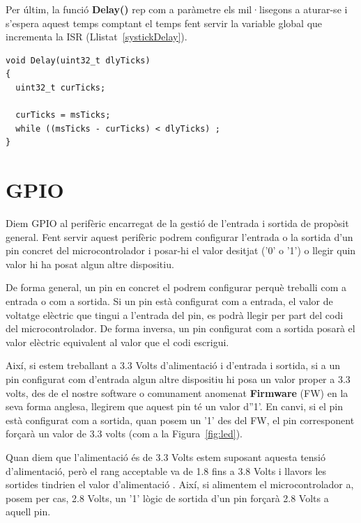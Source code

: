 Per últim, la funció {\bf Delay()} rep com a paràmetre els mil·lisegons a aturar-se i s'espera aquest temps comptant el temps fent servir la variable global que incrementa la ISR (Llistat~\ref{systickDelay}).

\begin{lstlisting}[caption={Funció delay() amb {\em Systick}},style=customc,label=systickDelay]
void Delay(uint32_t dlyTicks)
{
  uint32_t curTicks;

  curTicks = msTicks;
  while ((msTicks - curTicks) < dlyTicks) ;
}
\end{lstlisting}



\chapter{GPIO}
\label{sub:GPIO_2}
Diem \gls{GPIO} al perifèric encarregat de la gestió de l'entrada i sortida de propòsit general. Fent servir aquest perifèric podrem configurar l'entrada o la sortida d'un pin concret del microcontrolador i posar-hi el valor desitjat ('0' o '1') o llegir quin valor hi ha posat algun altre dispositiu.

De forma general, un pin en concret el podrem configurar perquè treballi com a entrada o com a sortida. Si un pin està configurat com a entrada, el valor de voltatge elèctric que tingui a l'entrada del pin, es podrà llegir per part del codi del microcontrolador. De forma inversa, un pin configurat com a sortida posarà el valor elèctric equivalent al valor que el codi escrigui.

Així, si estem treballant a 3.3 Volts d'alimentació i d'entrada i sortida, si a un pin configurat com d'entrada algun altre dispositiu
hi posa un valor proper a 3.3 volts, des de el nostre software o comunament anomenat \textbf{Firmware} (\gls{FW}) en la seva forma anglesa, llegirem que aquest pin té un valor d''1'. En canvi, si el pin està configurat com a sortida, quan posem un '1' des del \gls{FW}, el pin corresponent forçarà un valor de 3.3 volts (com a la Figura~\ref{fig:led}).

\begin{remark}
 Quan diem que l'alimentació és de 3.3 Volts estem suposant aquesta tensió d'alimentació, però el rang acceptable va de 1.8 fins a 3.8 Volts i llavors les sortides tindrien el valor d'alimentació \cite[9]{EFM32TG840}. Així, si alimentem el microcontrolador a, posem per cas, 2.8 Volts, un '1' lògic de sortida d'un pin forçarà 2.8 Volts a aquell pin.
\end{remark}




